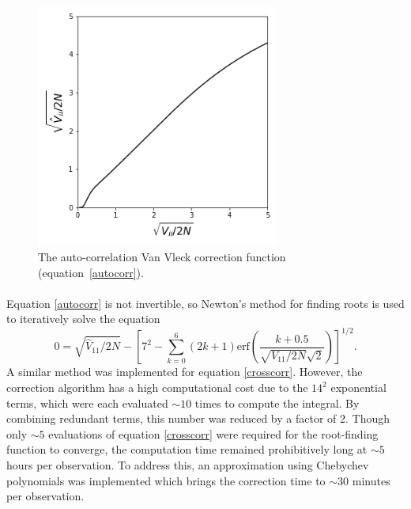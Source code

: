 \documentclass[11pt]{article}
\begin{document}
\begin{figure}
\centering{}
\includegraphics[width=80mm]{sigmatestplot4.png}
\caption{The auto-correlation Van Vleck correction function (equation~\ref{autocorr}).\label{sig}}
\end{figure}

\paragraph{}Equation \eqref{autocorr} is not invertible, so Newton's method for finding roots is used to iteratively solve the equation
\begin{equation}
0=\sqrt{\hat V_{11}/2N}-\left[7^2-\sum_{k=0}^6(2k+1)\textrm{erf}\left(\frac{k+0.5}{\sqrt{V_{11}/2N}\sqrt{2}}\right)\right]^{1/2}.
\end{equation}
A similar method was implemented for equation \eqref{crosscorr}. However, the correction algorithm has a high computational cost due to the $14^2$ exponential terms, which were each evaluated $\sim10$ times to compute the integral. By combining redundant terms, this number was reduced by a factor of 2. Though only $\sim5$ evaluations of equation \eqref{crosscorr} were required for the root-finding function to converge, the computation time remained prohibitively long at $\sim5$ hours per observation. To address this, an approximation using Chebychev polynomials was implemented which brings the correction time to $\sim30$ minutes per observation.
\end{document}

